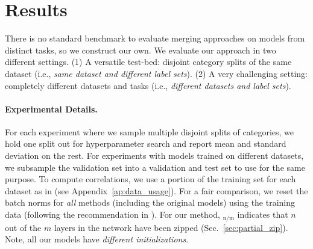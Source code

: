 \section{Results} \label{sec:results}
There is no standard benchmark to evaluate merging approaches on models from distinct tasks, so we construct our own. We evaluate our approach in two different settings.
(1) A versatile test-bed: disjoint category splits of the same dataset (i.e., \textit{same dataset and different label sets}).
(2) A very challenging setting: completely different datasets and tasks (i.e., \textit{different datasets and label sets}). 





\paragraph{Experimental Details.} 
For each experiment where we sample multiple disjoint splits of categories, we hold one split out for hyperparameter search and report mean and standard deviation on the rest. 
For experiments with models trained on different datasets, we subsample the validation set into a validation and test set to use for the same purpose.
To compute correlations, we use a portion of the training set for each dataset as in \citet{li2016convergenticlr} (see Appendix~\ref{ap:data_usage}).
For a fair comparison, we reset the batch norms for \textit{all} methods (including the original models) using the training data (following the recommendation in \citet{jordan2022repair}).
For our method, \name{}$_\text{n/m}$ indicates that $n$ out of the $m$ layers in the network have been zipped (Sec.~\ref{sec:partial_zip}).
Note, all our models have \textit{different initializations}.

